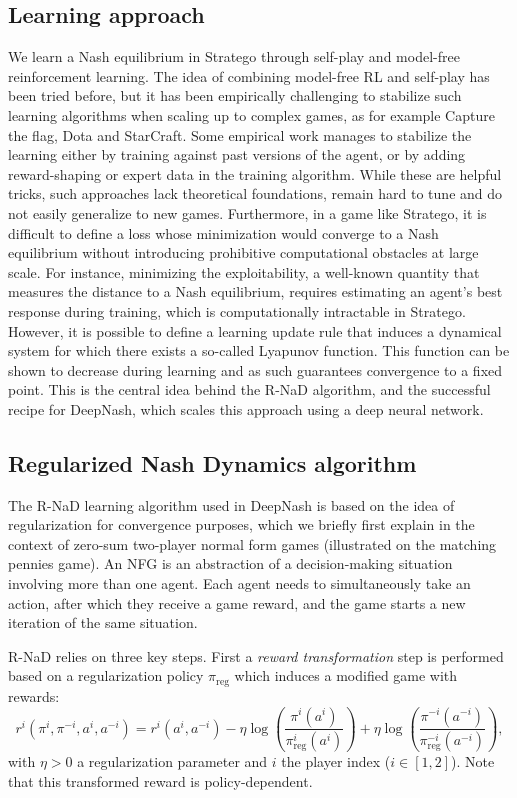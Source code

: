 \subsection{Learning approach}
We learn a Nash equilibrium in Stratego through self-play and model-free reinforcement learning. The idea of combining model-free RL and self-play has been tried before, but it has been empirically challenging to stabilize such learning algorithms when scaling up to complex games, as for example Capture the flag, Dota and StarCraft. Some empirical work manages to stabilize the learning either by training against past versions of the agent, or by adding reward-shaping or expert data in the training algorithm. While these are helpful tricks, such approaches lack theoretical foundations, remain hard to tune and do not easily generalize to new games. Furthermore, in a game like Stratego, it is difficult to define a loss whose minimization would converge to a Nash equilibrium without introducing prohibitive computational obstacles at large scale. For instance, minimizing the exploitability, a well-known quantity that measures the distance to a Nash equilibrium, requires estimating an agent's best response during training, which is computationally intractable in Stratego. However, it is possible to define a learning update rule that induces a dynamical system for which there exists a so-called Lyapunov function. This function can be shown to decrease during learning and as such guarantees convergence to a fixed point. This is the central idea behind the R-NaD algorithm, and the successful recipe for DeepNash, which scales this approach using a deep neural network.

\subsection{Regularized Nash Dynamics algorithm}
The R-NaD learning algorithm used in DeepNash is based on the idea of regularization for convergence purposes, which we briefly first explain in the context of zero-sum two-player normal form games (illustrated on the matching pennies game). An NFG is an abstraction of a decision-making situation involving more than one agent. Each agent needs to simultaneously take an action, after which they receive a game reward, and the game starts a new iteration of the same situation.

R-NaD relies on three key steps. First a \emph{reward transformation} step is performed based on a regularization policy $\pi_{\textrm{reg}}$ which induces a modified game with rewards:
$$r^i(\pi^i, \pi^{-i},a^i, a^{-i}) = r^i(a^i, a^{-i}) - \eta \log\!\left(\frac{\pi^i(a^i)}{\pi^i_{\textrm{reg}}(a^i)}\right) + \eta \log\!\left(\frac{\pi^{-i}(a^{-i})}{\pi^{-i}_{\textrm{reg}}(a^{-i})}\right),$$
with $\eta > 0$ a regularization parameter and $i$ the player index ($i\in [1, 2]$). Note that this transformed reward is policy-dependent.

